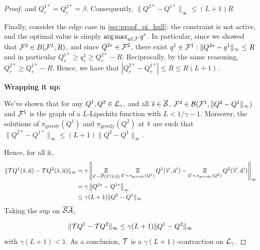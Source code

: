\begin{proof}
and $Q_c^{1*} = Q_c^{2*} = \beta$.
Consequently, $ \|Q^{2*} - Q^{1*}\|_\infty \leq (L+1)R$

Finally, consider the edge case in \autoref{sec:proof_pi_hull}: the constraint is not active, and the optimal value is simply $\operatorname*{arg\,max}_{q\in\mathcal{F}} q^r$. In particular, since we showed that $\mathcal{F}^2\in B(\mathcal{F}^1, R)$, and since $Q^{2*}\in \mathcal{F}^2$, there exist $q^1\in \mathcal{F}^1: \|Q^{2*}-q^1\|_\infty\leq R$ and in particular $Q^{1*}_r \geq q^1_r \geq Q^{2*}_r - R$. Reciprocally, by the same reasoning, $Q^{2*}_r \geq Q^{1*}_r - R$. Hence, we have that $| Q_r^{2*} - Q_r^{1*}| \leq R \leq R(L+1).$

\textbf{Wrapping it up:}

We've shown that for any $Q^1,Q^2\in\mathcal{L}_\gamma$, and all $\overline{s}\in\overline{\mathcal{S}}$, $\mathcal{F}^2\in\mathcal{B}(\mathcal{F}^1,\|Q^2-Q^1\|_\infty)$ and $\mathcal{F}^1$ is the graph of a $L$-Lipschitz function with $L<1/\gamma - 1$. Moreover, the solutions of $\pi_\text{greedy}(Q^1)$ and $\pi_\text{greedy}(Q^2)$ at $\overline{s}$ are such that $ \|Q^{2*} - Q^{1*}\|_\infty \leq (L+1)\|Q^2-Q^1\|_\infty$.

Hence, for all $\overline{a}$,
\begin{align*}
    \|\mathcal{T} Q^1(\overline{s}, \overline{a}) - \mathcal{T} Q^2(\overline{s}, \overline{a})\|_\infty &= \gamma\left\|\operatorname*{\mathbb{E}}\limits_{\overline{s}'\sim\overline{P}(\overline{s}'|\overline{s},\overline{a})} \operatorname*{\mathbb{E}}\limits_{\overline{a}'\sim\pi_\text{greedy}(Q^1)}Q^1(\overline{s}',\overline{a}') - \operatorname*{\mathbb{E}}\limits_{\overline{a}'\sim\pi_\text{greedy}(Q^2)}Q^2(\overline{s}',\overline{a}')\right\|_\infty \\
    &= \gamma\left\|Q^{2*} - Q^{1*}\right\|_\infty \\
    &\leq \gamma(L+1)\|Q^2-Q^1\|_\infty
\end{align*}
Taking the sup on $\overline{\mathcal{S}}\overline{\mathcal{A}}$,

\begin{equation*}
    \|\mathcal{T} Q^1 - \mathcal{T} Q^2\|_\infty \leq \gamma(L+1)\|Q^1-Q^2\|_\infty
\end{equation*}
with $\gamma(L+1) < 1$.
As a conclusion, $\mathcal{T}$ is a $\gamma(L+1)$-contraction on $\mathcal{L}_\gamma$.
\end{proof}





